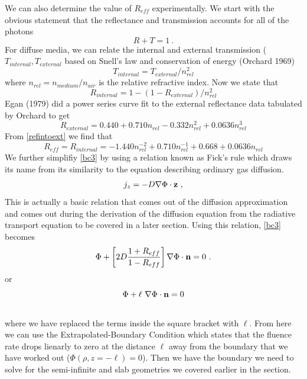 We can also determine the value of $R_{eff}$ experimentally. We start with the obvious statement that the reflectance and transmission accounts for all of the photons
\begin{equation}
  R + T = 1 \ .
\end{equation}
For diffuse media, we can relate the internal and external transmission ($T_{internal}, T_{external}$ based on Snell's law and conservation of energy (Orchard 1969)
\begin{equation}
  T_{internal} = T_{external} /n_{rel}^2
\end{equation}
where $n_{rel} = n_{medium}/n_{air}$ is the relative refractive index. Now we state that
\begin{equation}
\label{refinttoext}
R_{internal} = 1 - (1 - R_{external})/n_{rel}^2
\end{equation}
Egan (1979) \cite{Egan1979} did a power series curve fit to the external reflectance data tabulated by Orchard \cite{Orchard1969} to get
\begin{equation}
R_{external} = 0.440 + 0.710n_{rel} -0.332n_{rel}^2 + 0.0636n_{rel}^3
\end{equation}
From \ref{refintoext} we find that \cite{Sevick2002}
\begin{equation}
\label{exp eff}
R_{eff} = R_{internal} = -1.440n_{rel}^{-2} + 0.710n_{rel}^{-1} + 0.668 + 0.0636n_{rel}
\end{equation}
\noindent
We further simplifiy \ref{bc3} by using a relation known as Fick's rule which draws its name from its similarity to the equation describing ordinary gas diffusion.
\begin{equation}
j_z = -D \nabla \Phi \cdot {\bf z} \ ,
\end{equation}
\noindent
This is actually a basic relation that comes out of the diffusion approximation and comes out during the derivation of the diffusion equation from the radiative transport equation \cite{Case1967} to be covered in a later section. Using this relation, \ref{bc3} becomes
\begin{equation}
\label{bc4}
\Phi + \left[2D \frac{1+R_{eff}}{1-R_{eff}}\right] \nabla \Phi \cdot {\bf n} = 0 \ .
\end{equation}
or
\begin{equation}
\label{BC_DE}
\Phi + \ell\ \nabla \Phi\cdot{\bf n} = 0
\end{equation}
\\
\noindent
where we have replaced the terms inside the square bracket with $\ell$. From here we can use the Extrapolated-Boundary Condition \cite{Haskell1994, Aronson1993, Aronson1995} which states that the fluence rate drops lienarly to zero at the distance $\ell$ away from the boundary that we have worked out ($\Phi(\rho,z=-\ell) = 0$). Then we have the boundary we need to solve for the semi-infinite and slab geometries we covered earlier in the section.
